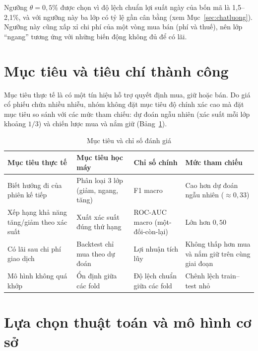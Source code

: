 \documentclass[12pt,a4paper,oneside]{report}
\begin{document}
Ngưỡng $\theta = 0{,}5\%$ được chọn vì độ lệch chuẩn lợi suất ngày của bốn mã
là 1,5--2,1\%, và với ngưỡng này ba lớp có tỷ lệ gần cân bằng (xem
Mục~\ref{sec:chatluong}). Ngưỡng này cũng xấp xỉ chi phí của một vòng mua bán
(phí và thuế), nên lớp ``ngang'' tương ứng với những biến động không đủ để có
lãi.

\section{Mục tiêu và tiêu chí thành công}

Mục tiêu thực tế là có một tín hiệu hỗ trợ quyết định mua, giữ hoặc bán. Do
giá cổ phiếu chứa nhiều nhiễu, nhóm không đặt mục tiêu độ chính xác cao mà đặt
mục tiêu so sánh với các mức tham chiếu: dự đoán ngẫu nhiên (xác suất mỗi lớp
khoảng $1/3$) và chiến lược mua và nắm giữ (Bảng~\ref{tab:muctieu}).

\begin{table}[H]
  \centering
  \caption{Mục tiêu và chỉ số đánh giá}
  \label{tab:muctieu}
  \begin{tabularx}{\textwidth}{>{\raggedright\arraybackslash}X >{\raggedright\arraybackslash}X
                               >{\centering\arraybackslash}p{2.8cm} >{\centering\arraybackslash}p{3.4cm}}
    \toprule
    \textbf{Mục tiêu thực tế} & \textbf{Mục tiêu học máy} & \textbf{Chỉ số chính} & \textbf{Mức tham chiếu} \\
    \midrule
    Biết hướng đi của phiên kế tiếp & Phân loại 3 lớp (giảm, ngang, tăng) & F1 macro & Cao hơn dự đoán ngẫu nhiên ($\approx 0{,}33$) \\
    Xếp hạng khả năng tăng/giảm theo xác suất & Xuất xác suất đúng thứ hạng & ROC-AUC macro (một-đối-còn-lại) & Lớn hơn $0{,}50$ \\
    Có lãi sau chi phí giao dịch & Backtest chỉ mua theo dự đoán & Lợi nhuận tích lũy & Không thấp hơn mua và nắm giữ trên cùng giai đoạn \\
    Mô hình không quá khớp & Ổn định giữa các fold & Độ lệch chuẩn giữa các fold & Chênh lệch train--test nhỏ \\
    \bottomrule
  \end{tabularx}
\end{table}

\section{Lựa chọn thuật toán và mô hình cơ sở}
\end{document}
